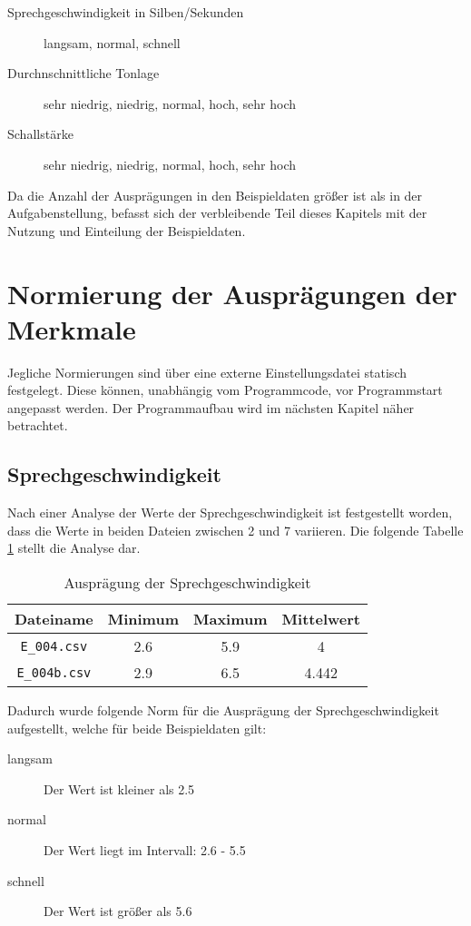 \begin{description}
  \item [Sprechgeschwindigkeit in Silben/Sekunden] langsam, normal, schnell
  \item [Durchnschnittliche Tonlage] sehr niedrig, niedrig, normal, hoch, sehr hoch
  \item [Schallstärke] sehr niedrig, niedrig, normal, hoch, sehr hoch
\end{description}

Da die Anzahl der Ausprägungen in den Beispieldaten größer ist als in der Aufgabenstellung, befasst sich der verbleibende Teil dieses Kapitels mit der Nutzung und Einteilung der Beispieldaten.

\section{Normierung der Ausprägungen der Merkmale}
Jegliche Normierungen sind über eine externe Einstellungsdatei statisch festgelegt. Diese können, unabhängig vom Programmcode, vor Programmstart angepasst werden. Der Programmaufbau wird im nächsten Kapitel näher betrachtet.

\subsection{Sprechgeschwindigkeit}
\label{sprechgeschwindigkeit_auspr}
Nach einer Analyse der Werte der Sprechgeschwindigkeit ist festgestellt worden, dass die Werte in beiden Dateien zwischen 2 und 7 variieren. Die folgende Tabelle \ref{tab:sprechgeschwdingikeit} stellt die Analyse dar. 

\begin{table}[h]
\begin{tabular}{ c | c | c | c}
  Dateiname & Minimum & Maximum & Mittelwert \\
  \hline 
  \verb|E_004.csv|  & 2.6 & 5.9 & 4 \\
  \verb|E_004b.csv| & 2.9 & 6.5 & 4.442 \\
\end{tabular}
\caption{Ausprägung der Sprechgeschwindigkeit}
\label{tab:sprechgeschwdingikeit}
\end{table}

Dadurch wurde folgende Norm für die Ausprägung der Sprechgeschwindigkeit aufgestellt, welche für beide Beispieldaten gilt:
\begin{description}
  \item [langsam] Der Wert ist kleiner als 2.5
  \item [normal] Der Wert liegt im Intervall: 2.6 - 5.5
  \item [schnell] Der Wert ist größer als 5.6
\end{description}

